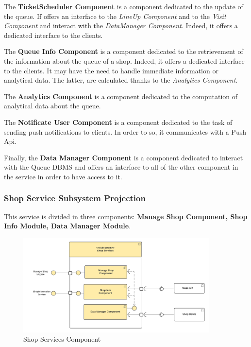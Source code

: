 The \textbf{TicketScheduler Component} is a component dedicated to the update of the queue. If offers an interface to the \textit{LineUp Component} and to the \textit{Visit Component} and interact with the \textit{DataManager Component}. Indeed, it offers a dedicated interface to the clients.

The \textbf{Queue Info Component} is a component dedicated to the retrievement of the information about the queue of a shop.
Indeed, it offers a dedicated interface to the clients. It may have the need to handle immediate information or analytical data. The latter, are calculated thanks to the \textit{Analytics Component}.

The \textbf{Analytics Component} is a component dedicated to the computation of analytical data about the queue.

The \textbf{Notificate User Component} is a component dedicated to the task of sending push notifications to clients. In order to so, it communicates with a Push Api.

Finally, the \textbf{Data Manager Component} is a component dedicated to interact with the Queue DBMS and offers an interface to all of the other component in the service in order to have access to it.

\subsubsection{Shop Service Subsystem Projection}
\label{susbsubsect:shopservice}

This service is divided in three components: \textbf{Manage Shop Component, Shop Info Module, Data Manager Module}.

\begin{figure}[h!]
    \centering
    \includegraphics[width=0.9\textwidth]{Images/ComponentViewShopServices(1).png}
    \caption{\label{fig:ComponentViewShopServices}{Shop Services Component}}
\end{figure}

